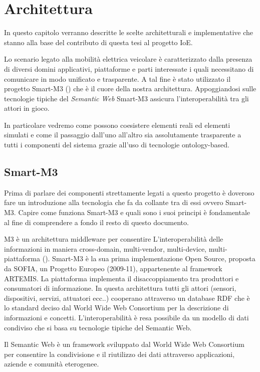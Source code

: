 \chapter{Architettura}

In questo capitolo verranno descritte le scelte architetturali e implementative che stanno alla base del contributo di questa tesi al progetto IoE. 

Lo scenario legato alla mobilità elettrica veicolare è caratterizzato dalla presenza di diversi domini applicativi, piattaforme e parti interessate i quali necessitano di comunicare in modo unificato e trasparente. A tal fine è stato utilizzato il progetto Smart-M3 (\cite{tullio2011}) che è il cuore della nostra architettura. Appoggiandosi sulle tecnologie tipiche del \emph{Semantic Web} Smart-M3 assicura l'interoperabilità tra gli attori in gioco. 

In particolare vedremo come possono coesistere elementi reali ed elementi simulati e come il passaggio dall'uno all'altro sia assolutamente trasparente a tutti i componenti del sistema grazie all'uso di tecnologie ontology-based.

\section{Smart-M3}

Prima di parlare dei componenti strettamente legati a questo progetto è doveroso fare un introduzione alla tecnologia che fa da collante tra di essi ovvero Smart-M3. Capire come funziona Smart-M3 e quali sono i suoi principi è fondamentale al fine di comprendere a fondo il resto di questo documento.

M3 è un architettura middleware per consentire L'interoperabilità delle informazioni in maniera cross-domain, multi-vendor, multi-device, multi-piattaforma (\cite{smart2013}). Smart-M3 è la sua prima implementazione Open Source, proposta da SOFIA, un Progetto Europeo (2009-11), appartenente al framework ARTEMIS. 
La piattaforma implementa il disaccoppiamento tra produttori e consumatori di informazione. In questa architettura tutti gli attori (sensori, dispositivi, servizi, attuatori ecc..) cooperano attraverso un database RDF che è lo standard deciso dal World Wide Web Consortium per la descrizione di informazioni e concetti. L'interoperabilità è resa possibile da un modello di dati condiviso che si basa su tecnologie tipiche del Semantic Web.

Il Semantic Web è un framework sviluppato dal World Wide Web Consortium per consentire la condivisione e il riutilizzo dei dati attraverso  applicazioni, aziende e comunità eterogenee.

